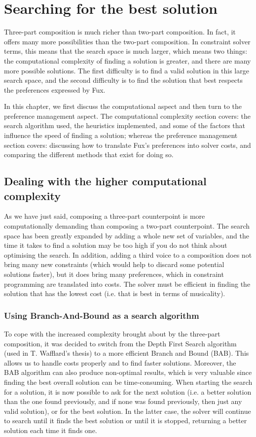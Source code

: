 \chapter{Searching for the best solution}\label{chapter:search}
Three-part composition is much richer than two-part composition. In fact, it offers many more possibilities than the two-part composition. In constraint solver terms, this means that the search space is much larger, which means two things: the computational complexity of finding a solution is greater, and there are many more possible solutions. The first difficulty is to find a valid solution in this large search space, and the second difficulty is to find the solution that best respects the preferences expressed by Fux.

In this chapter, we first discuss the computational aspect and then turn to the preference management aspect.
The computational complexity section covers: the search algorithm used, the heuristics implemented, and some of the factors that influence the speed of finding a solution; whereas the preference management section covers: discussing how to translate Fux's preferences into solver costs, and comparing the different methods that exist for doing so. 

\section{Dealing with the higher computational complexity}
As we have just said, composing a three-part counterpoint is more computationally demanding than composing a two-part counterpoint. The search space has been greatly expanded by adding a whole new set of variables, and the time it takes to find a solution may be too high if you do not think about optimising the search. In addition, adding a third voice to a composition does not bring many new constraints (which would help to discard some potential solutions faster), but it does bring many preferences, which in constraint programming are translated into costs. The solver must be efficient in finding the solution that has the lowest cost (i.e. that is best in terms of musicality).

\subsection{Using Branch-And-Bound as a search algorithm}

To cope with the increased complexity brought about by the three-part composition, it was decided to switch from the Depth First Search algorithm (used in T. Wafflard's thesis) to a more efficient Branch and Bound (BAB). This allows us to handle costs properly and to find faster solutions. Moreover, the BAB algorithm can also produce non-optimal results, which is very valuable since finding the best overall solution can be time-consuming. When starting the search for a solution, it is now possible to ask for the next solution (i.e. a better solution than the one found previously, and if none was found previously, then just any valid solution), or for the best solution. In the latter case, the solver will continue to search until it finds the best solution or until it is stopped, returning a better solution each time it finds one.


